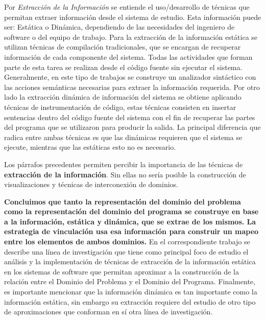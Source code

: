 \documentclass[12pt]{report}
\begin{document}
Por \textit{Extracción de la Información} se entiende el uso/desarrollo de técnicas que permitan extraer información desde el sistema de estudio. 
Esta información puede ser: Estática o Dinámica, dependiendo de las necesidades del 
ingeniero de software o del equipo de trabajo.
Para la extracción de la información estática se utilizan técnicas de compilación tradicionales, que se encargan de recuperar información de cada componente del sistema. Todas las actividades que forman parte de esta tarea se realizan desde el código fuente sin ejecutar el sistema. Generalmente, en este tipo de trabajos se construye un analizador sintáctico con las acciones semánticas necesarias para extraer la información requerida.
Por otro lado la extracción dinámica de información del sistema se obtiene  
aplicando técnicas de instrumentación de código, estas técnicas consisten en insertar sentencias dentro del código fuente del sistema con el fin de recuperar las partes del programa que se utilizaron para 
producir la salida. 
La principal diferencia que radica entre ambas técnicas es que las dinámicas requieren que el sistema se ejecute, mientras que las estáticas esto no es necesario.

Los párrafos precedentes permiten percibir la importancia de las técnicas de \textbf{extracción de la información}. 
Sin ellas no sería posible la construcción de visualizaciones y técnicas de interconexión de dominios\cite{BRM10}. 

\textbf{Concluimos que tanto la representación del dominio del problema como la representación del dominio del programa se construye en base a la información, estática y dinámica, que se extrae de los mismos. 
La estrategia de vinculación usa esa información para construir un mapeo entre los elementos de ambos dominios.}
En el correspondiente trabajo se describe una línea de investigación que tiene como principal foco de estudio el análisis y la implementación de técnicas de extracción de la información estática en los sistemas de software que permitan aproximar a la construcción de la relación entre el Dominio del Problema y el Dominio del Programa.
Finalmente, es importante mencionar que la información dinámica es tan importante como la información estática, sin embargo su extracción requiere del estudio de otro tipo de aproximaciones que conforman en sí otra línea de investigación.
\end{document}
